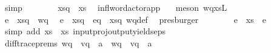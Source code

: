 \begin{isabellebody}
\ simp\isanewline
\ \ \ \ \ \ \isamarkupfalse%
\ {\isachardoublequoteopen}xs{\isasymdown}\isactrlsub q\ {\isacharequal}{\kern0pt}\ xs{\isachardoublequoteclose}\ \isamarkupfalse%
\ infl{\isacharunderscore}{\kern0pt}word{\isacharunderscore}{\kern0pt}actor{\isacharunderscore}{\kern0pt}app\ \ \isamarkupfalse%
\ {\isacharparenleft}{\kern0pt}meson\ wqxs{\isacharunderscore}{\kern0pt}L{\isacharparenright}{\kern0pt}\ \isanewline
\ \ \ \ \ \ \isamarkupfalse%
\ \isamarkupfalse%
\ {\isachardoublequoteopen}{\isacharparenleft}{\kern0pt}e\ {\isasymsqdot}\ xs{\isacharparenright}{\kern0pt}{\isasymdown}\isactrlsub q\ {\isacharequal}{\kern0pt}\ {\isacharquery}{\kern0pt}wq{\isachardoublequoteclose}\ \isamarkupfalse%
\ {\isacartoucheopen}{\isacharparenleft}{\kern0pt}e\ {\isasymsqdot}\ xs{\isacharparenright}{\kern0pt}{\isasymdown}\isactrlsub q\ {\isacharequal}{\kern0pt}\ e{\isasymdown}\isactrlsub q\ {\isasymsqdot}\ xs{\isasymdown}\isactrlsub q{\isacartoucheclose}\ wq{\isacharunderscore}{\kern0pt}def\ \isamarkupfalse%
\ presburger\isanewline
\ \ \ \ \ \ \isamarkupfalse%
\ {\isachardoublequoteopen}{\isacharparenleft}{\kern0pt}e\ {\isasymsqdot}\ xs{\isacharparenright}{\kern0pt}{\isasymdown}\isactrlsub {\isacharbang}{\kern0pt}\ {\isacharequal}{\kern0pt}\ e{\isasymdown}\isactrlsub {\isacharbang}{\kern0pt}{\isachardoublequoteclose}\ \isamarkupfalse%
\ {\isacharparenleft}{\kern0pt}simp\ add{\isacharcolon}{\kern0pt}\ {\isacartoucheopen}xs{\isasymdown}\isactrlsub {\isacharquery}{\kern0pt}\ {\isacharequal}{\kern0pt}\ xs{\isacartoucheclose}\ input{\isacharunderscore}{\kern0pt}proj{\isacharunderscore}{\kern0pt}output{\isacharunderscore}{\kern0pt}yields{\isacharunderscore}{\kern0pt}eps{\isacharparenright}{\kern0pt}\isanewline
\ \ \ \ \ \ \isamarkupfalse%
\ diff{\isacharunderscore}{\kern0pt}trace{\isacharunderscore}{\kern0pt}prems{}{\isacharcolon}{\kern0pt}\ {\isachardoublequoteopen}{\isacharquery}{\kern0pt}wq{\isasymdown}\isactrlsub {\isacharquery}{\kern0pt}\ {\isacharequal}{\kern0pt}\ {\isacharparenleft}{\kern0pt}{\isacharquery}{\kern0pt}v{\isacharprime}{\kern0pt}{\isasymdown}\isactrlsub q\ {\isasymsqdot}\ {\isacharbrackleft}{\kern0pt}a{\isacharbrackright}{\kern0pt}{\isacharparenright}{\kern0pt}{\isasymdown}\isactrlsub {\isacharquery}{\kern0pt}\ {\isasymand}\ {\isacharquery}{\kern0pt}wq{\isasymdown}\isactrlsub {\isacharbang}{\kern0pt}\ {\isacharequal}{\kern0pt}\ {\isacharparenleft}{\kern0pt}{\isacharquery}{\kern0pt}v{\isacharprime}{\kern0pt}{\isasymdown}\isactrlsub q\ {\isasymsqdot}\ {\isacharbrackleft}{\kern0pt}a{\isacharbrackright}{\kern0pt}{\isacharparenright}{\kern0pt}{\isasymdown}\isactrlsub {\isacharbang}{\kern0pt}\ {\isasymand}\ \isanewline

\end{isabellebody}

